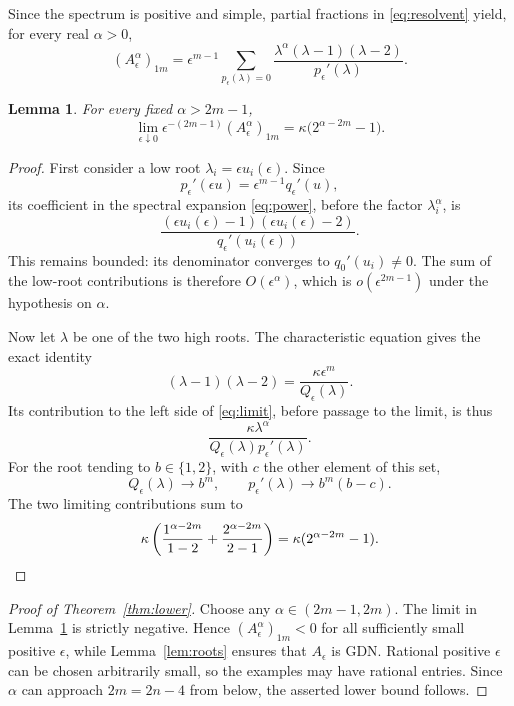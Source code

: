 \documentclass[11pt]{article}
\newtheorem{lemma}[theorem]{Lemma}
\begin{document}
Since the spectrum is positive and simple, partial fractions in \eqref{eq:resolvent} yield, for every real $\alpha>0$,
\begin{equation}\label{eq:power}
(A_\epsilon^\alpha)_{1m}
=\epsilon^{m-1}\sum_{p_\epsilon(\lambda)=0}
\frac{\lambda^\alpha(\lambda-1)(\lambda-2)}{p_\epsilon'(\lambda)}.
\end{equation}

\begin{lemma}\label{lem:limit}
For every fixed $\alpha>2m-1$,
\begin{equation}\label{eq:limit}
\lim_{\epsilon\downarrow0}\epsilon^{-(2m-1)}(A_\epsilon^\alpha)_{1m}
=\kappa\bigl(2^{\alpha-2m}-1\bigr).
\end{equation}
\end{lemma}
\begin{proof}
First consider a low root $\lambda_i=\epsilon u_i(\epsilon)$. Since
\[
p_\epsilon'(\epsilon u)=\epsilon^{m-1}q_\epsilon'(u),
\]
its coefficient in the spectral expansion \eqref{eq:power}, before the factor $\lambda_i^\alpha$, is
\[
\frac{(\epsilon u_i(\epsilon)-1)(\epsilon u_i(\epsilon)-2)}
{q_\epsilon'(u_i(\epsilon))}.
\]
This remains bounded: its denominator converges to $q_0'(u_i)\ne0$. The sum of the low-root contributions is therefore $O(\epsilon^\alpha)$, which is $o(\epsilon^{2m-1})$ under the hypothesis on $\alpha$.

Now let $\lambda$ be one of the two high roots. The characteristic equation gives the exact identity
\[
(\lambda-1)(\lambda-2)=\frac{\kappa\epsilon^m}{Q_\epsilon(\lambda)}.
\]
Its contribution to the left side of \eqref{eq:limit}, before passage to the limit, is thus
\[
\frac{\kappa\lambda^\alpha}{Q_\epsilon(\lambda)p_\epsilon'(\lambda)}.
\]
For the root tending to $b\in\{1,2\}$, with $c$ the other element of this set,
\[
Q_\epsilon(\lambda)\longrightarrow b^m,
\qquad p_\epsilon'(\lambda)\longrightarrow b^m(b-c).
\]
The two limiting contributions sum to
\[
\kappa\left(\frac{1^{\alpha-2m}}{1-2}
+\frac{2^{\alpha-2m}}{2-1}\right)
=\kappa(2^{\alpha-2m}-1).
\qedhere
\]
\end{proof}

\begin{proof}[Proof of Theorem~\ref{thm:lower}]
Choose any $\alpha\in(2m-1,2m)$. The limit in Lemma~\ref{lem:limit} is strictly negative. Hence $(A_\epsilon^\alpha)_{1m}<0$ for all sufficiently small positive $\epsilon$, while Lemma~\ref{lem:roots} ensures that $A_\epsilon$ is GDN. Rational positive $\epsilon$ can be chosen arbitrarily small, so the examples may have rational entries. Since $\alpha$ can approach $2m=2n-4$ from below, the asserted lower bound follows.
\end{proof}
\end{document}
